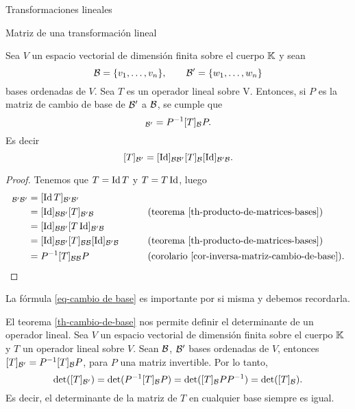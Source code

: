 \begin{chapter}{Transformaciones lineales}
\begin{section}{Matriz de una transformaci\'on lineal}
    
            
        \begin{teorema}\label{th-cambio-de-base}
            Sea $V$ un espacio vectorial de dimensión finita sobre el cuerpo $\mathbb K$ y sean
            $$
            \mathcal{B} = \{v_1,\ldots,v_n \}, \qquad \mathcal{B}' = \{w_1,\ldots,w_n \}
            $$
            bases ordenadas de $V$. Sea $T$ es un operador lineal sobre V. Entonces, si $P$ es la matriz de cambio de base de $\mathcal{B}'$ a $\mathcal{B}$, se cumple que  
            \begin{equation*}
            [T]_{\cB'} = P^{-1}[T]_{\cB}  P.
            \end{equation*}
            Es decir
            \begin{equation}\label{eq-cambio de base}
                [T]_{\mathcal{B}'} = [\operatorname{Id}]_{\mathcal{B} \mathcal{B}'} [T]_{\mathcal{B}} [\operatorname{Id}]_{\mathcal{B}' \mathcal{B}}.
            \end{equation}
        \end{teorema}
        \begin{proof} Tenemos que $T = \operatorname{Id} T$ y $T =T  \operatorname{Id}$, luego 
            \begin{align*}
                [T]_{\cB'\cB'} &=  [\Id T]_{\cB'\cB'}& \qquad& \\
                &= [\Id]_{\cB \cB'} [T]_{\cB' \cB}& &(\text{teorema \ref{th-producto-de-matrices-bases}})  \\
                &= [\Id]_{\cB \cB'} [T \Id]_{\cB' \cB}& &\\
                &= [\Id]_{\cB \cB'} [T]_{\cB\cB} [\Id]_{\cB' \cB}& &(\text{teorema \ref{th-producto-de-matrices-bases}}) \\
                &=P^{-1}[T]_{\cB\cB}P& &(\text{corolario \ref{cor-inversa-matriz-cambio-de-base}}).
            \end{align*} 
        \end{proof}
    
        La fórmula \eqref{eq-cambio de base}  es importante por si misma y debemos recordarla.

        El teorema \ref{th-cambio-de-base} nos permite definir el determinante de un operador lineal.	Sea $V$ un espacio vectorial de dimensión finita sobre el cuerpo $\mathbb K$ y $T$ un operador lineal sobre $V$. Sean  $\mathcal{B}$, $\mathcal{B}'$ 
        bases ordenadas de $V$, entonces $[T]_{\mathcal{B}'} = P^{-1}[T]_{\mathcal{B}}P$, para $P$ una matriz invertible. Por lo tanto, 
        \begin{equation*}
            \det([T]_{\mathcal{B}'}) = \det(P^{-1}[T]_{\mathcal{B}}  P) =  \det([T]_{\mathcal{B}}  PP^{-1}) =  \det([T]_{\mathcal{B}}). 
        \end{equation*}
        Es decir,  el determinante de la matriz de $T$ en cualquier base siempre es igual.
        

\end{section}
\end{chapter}
